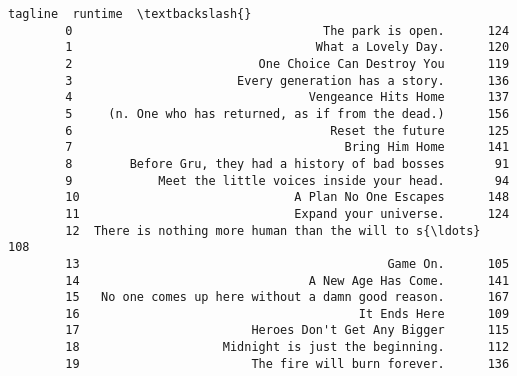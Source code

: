 \documentclass[11pt]{article}
\begin{document}
\begin{Verbatim}[commandchars=\\\{\}]
                                                      tagline  runtime  \textbackslash{}
        0                                   The park is open.      124   
        1                                  What a Lovely Day.      120   
        2                          One Choice Can Destroy You      119   
        3                       Every generation has a story.      136   
        4                                 Vengeance Hits Home      137   
        5     (n. One who has returned, as if from the dead.)      156   
        6                                    Reset the future      125   
        7                                      Bring Him Home      141   
        8        Before Gru, they had a history of bad bosses       91   
        9            Meet the little voices inside your head.       94   
        10                              A Plan No One Escapes      148   
        11                              Expand your universe.      124   
        12  There is nothing more human than the will to s{\ldots}      108   
        13                                           Game On.      105   
        14                                A New Age Has Come.      141   
        15   No one comes up here without a damn good reason.      167   
        16                                       It Ends Here      109   
        17                        Heroes Don't Get Any Bigger      115   
        18                    Midnight is just the beginning.      112   
        19                        The fire will burn forever.      136   
        

\end{Verbatim}
\end{document}
